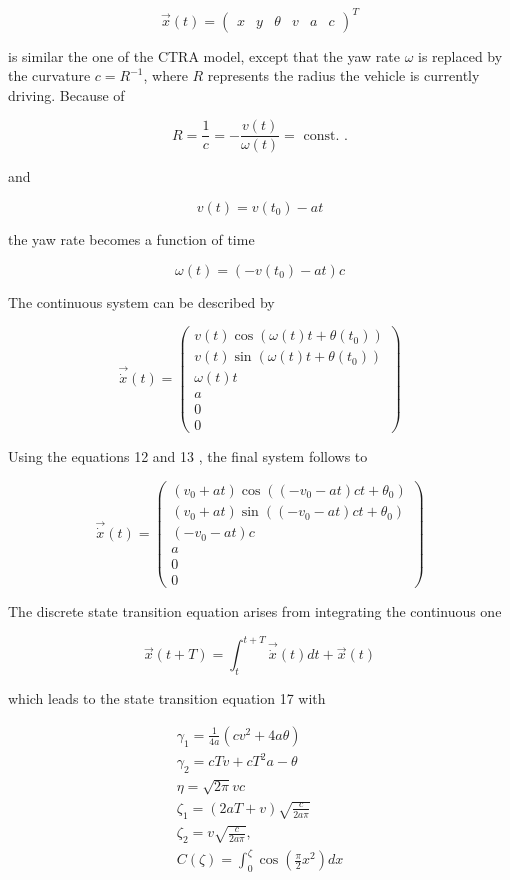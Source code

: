 $$
\vec{x}(t)=\left(\begin{array}{cccccc}
	x & y & \theta & v & a & c
\end{array}\right)^{T}
$$

is similar the one of the CTRA model, except that the yaw rate $\omega$ is replaced by the curvature $c=R^{-1}$, where $R$ represents the radius the vehicle is currently driving. Because of

$$
R=\frac{1}{c}=-\frac{v(t)}{\omega(t)}=\text { const. } .
$$

and

$$
v(t)=v\left(t_{0}\right)-a t
$$

the yaw rate becomes a function of time

$$
\omega(t)=\left(-v\left(t_{0}\right)-a t\right) c
$$

The continuous system can be described by

$$
\overrightarrow{\dot{x}}(t)=\left(\begin{array}{c}
	v(t) \cos \left(\omega(t) t+\theta\left(t_{0}\right)\right) \\
	v(t) \sin \left(\omega(t) t+\theta\left(t_{0}\right)\right) \\
	\omega(t) t \\
	a \\
	0 \\
	0
\end{array}\right)
$$

Using the equations 12 and 13 , the final system follows to

$$
\overrightarrow{\dot{x}}(t)=\left(\begin{array}{c}
	\left(v_{0}+a t\right) \cos \left(\left(-v_{0}-a t\right) c t+\theta_{0}\right) \\
	\left(v_{0}+a t\right) \sin \left(\left(-v_{0}-a t\right) c t+\theta_{0}\right) \\
	\left(-v_{0}-a t\right) c \\
	a \\
	0 \\
	0
\end{array}\right)
$$

The discrete state transition equation arises from integrating the continuous one

$$
\vec{x}(t+T)=\int_{t}^{t+T} \overrightarrow{\dot{x}}(t) d t+\vec{x}(t)
$$

which leads to the state transition equation 17 with

$$
\begin{gathered}
	\gamma_{1}=\frac{1}{4 a}\left(c v^{2}+4 a \theta\right) \\
	\gamma_{2}=c T v+c T^{2} a-\theta \\
	\eta=\sqrt{2 \pi} v c \\
	\zeta_{1}=(2 a T+v) \sqrt{\frac{c}{2 a \pi}} \\
	\zeta_{2}=v \sqrt{\frac{c}{2 a \pi}}, \\
	C(\zeta)=\int_{0}^{\zeta} \cos \left(\frac{\pi}{2} x^{2}\right) d x
\end{gathered}
$$

